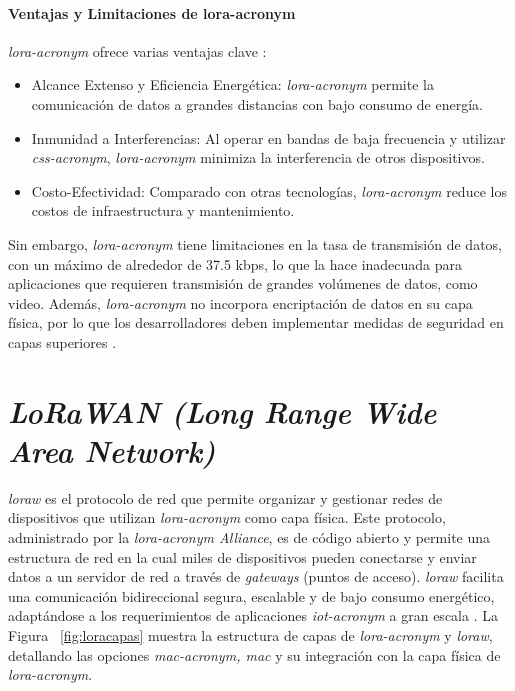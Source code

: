 \paragraph{Ventajas y Limitaciones de \acrshort{lora-acronym}\\}
\textit{\acrshort{lora-acronym}} ofrece varias ventajas clave \cite{doc_overviewsemtech, doc_loraphysemtech}:
\begin{itemize}
    \item Alcance Extenso y Eficiencia Energética: \textit{\acrshort{lora-acronym}} permite la comunicación de datos a grandes distancias con bajo consumo de energía.
    \item Inmunidad a Interferencias: Al operar en bandas de baja frecuencia y utilizar \textit{\acrshort{css-acronym}}, \textit{\acrshort{lora-acronym}} minimiza la interferencia de otros dispositivos.
    \item Costo-Efectividad: Comparado con otras tecnologías, \textit{\acrshort{lora-acronym}} reduce los costos de infraestructura y mantenimiento.
\end{itemize}

Sin embargo, \textit{\acrshort{lora-acronym}} tiene limitaciones en la tasa de transmisión de datos, con un máximo de alrededor de 37.5 kbps, lo que la hace inadecuada para aplicaciones que requieren transmisión de grandes volúmenes de datos, como video. Además, \textit{\acrshort{lora-acronym}} no incorpora encriptación de datos en su capa física, por lo que los desarrolladores deben implementar medidas de seguridad en capas superiores \cite{doc_overviewsemtech}.


\section{\textit{LoRaWAN (Long Range Wide Area Network)}}

\textit{\acrshort{loraw}} es el protocolo de red que permite organizar y gestionar redes de dispositivos que utilizan \textit{\acrshort{lora-acronym}} como capa física. Este protocolo, administrado por la \textit{\acrshort{lora-acronym} Alliance}, es de código abierto y permite una estructura de red en la cual miles de dispositivos pueden conectarse y enviar datos a un servidor de red a través de \textit{gateways} (puntos de acceso). \textit{\acrshort{loraw}} facilita una comunicación bidireccional segura, escalable y de bajo consumo energético, adaptándose a los requerimientos de aplicaciones \textit{\acrshort{iot-acronym}} a gran escala \cite{doc_aboutlorawan, doc_lorawanstandardsemtech}. La Figura ~\ref{fig:loracapas} muestra la estructura de capas de \textit{\acrshort{lora-acronym}} y \textit{\acrshort{loraw}}, detallando las opciones \textit{\acrshort{mac-acronym}, \gls{mac} } y su integración con la capa física de \textit{\acrshort{lora-acronym}}.

